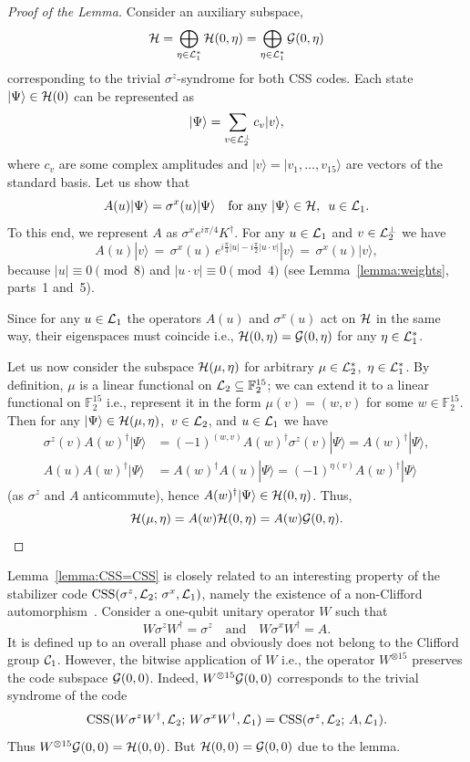 \documentclass[pra,twocolumn,showpacs]{revtex4}
\newcommand{\FF}{\mathbb{F}}
\newcommand{\calL}{{\cal L }}
\newcommand{\calH}{{\cal H }}
\newcommand{\calG}{{\cal G }}
\newcommand{\ra}{\rangle}
\newcommand*{\Cl}[1]{{\cal C}_{#1}}
\newcommand{\sx}{\sigma^x}
\newcommand{\sz}{\sigma^z}
\DeclareMathOperator*{\CSS}{\mathop{\mathrm{CSS}}}
\begin{document}
\begin{proof}[Proof of the Lemma]
Consider an auxiliary subspace,
\[
\calH=\bigoplus_{\eta\in \calL_1^*} \calH(0,\eta)=
\bigoplus_{\eta\in\calL_1^*} \calG(0,\eta)
\]
corresponding to the trivial $\sz$-syndrome for both CSS codes. Each
state $|\Psi\ra\in \calH(0)$ can be represented as
\[
|\Psi\ra = \sum_{v\in \calL_2^\perp} c_v |v\ra,
\]
where $c_v$ are some complex amplitudes and $|v\ra=|v_1,\ldots,v_{15}\ra$ are
vectors of the standard basis. Let us show that
\[
A(u)|\Psi\ra = \sx(u)|\Psi\ra\quad \text{for any}\ 
|\Psi\ra\in \calH,\,\ u\in\calL_1.
\]
To this end, we represent $A$ as $\sx e^{i\pi/4} K^\dag$. For any $u\in
\calL_1$ and $v\in\calL_2^{\perp}$ we have
\[
A(u)|v\ra \,=\,
\sigma^{x}(u)\, e^{i\frac{\pi}{4}|u|-i\frac{\pi}{2} |u\cdot v|}|v\ra
\,=\, \sigma^{x}(u) |v\ra,
\]
because $|u|\equiv 0\pmod{8}$ and $|u\cdot v|\equiv 0\pmod{4}$ (see
Lemma~\ref{lemma:weights}, parts~1 and~5).

Since for any $u\in \calL_1$ the operators $A(u)$ and $\sx(u)$ act on $\calH$
in the same way, their eigenspaces must coincide i.e.,
$\calH(0,\eta)=\calG(0,\eta)$ for any $\eta\in\calL_1^*$.

Let us now consider the subspace $\calH(\mu,\eta)$ for arbitrary
$\mu\in\calL_2^*$,\, $\eta\in\calL_1^*$. By definition, $\mu$ is a linear
functional on $\calL_2\subseteq\FF_{2}^{15}$; we can extend it to a linear
functional on $\FF_{2}^{15}$ i.e., represent it in the form $\mu(v)=(w,v)$
for some $w\in\FF_{2}^{15}$. Then for any $|\Psi\rangle\in\calH(\mu,\eta)$,\,
$v\in\calL_2$, and $u\in\calL_1$ we have
\begin{align*}
\sigma^{z}(v)A(w)^{\dag}|\Psi\rangle &=
(-1)^{(w,v)}A(w)^{\dag}\sigma^{z}(v)|\Psi\rangle
=A(w)^{\dag}|\Psi\rangle,\\[3pt]
A(u)A(w)^{\dag}|\Psi\rangle &=
A(w)^{\dag}A(u)|\Psi\rangle=(-1)^{\eta(v)}A(w)^{\dag}|\Psi\rangle
\end{align*}
(as $\sigma^{z}$ and $A$ anticommute), hence
$A(w)^{\dag}|\Psi\rangle\in\calH(0,\eta)$. Thus,
\[
\calH(\mu,\eta)=A(w)\calH(0,\eta)=A(w)\calG(0,\eta).
\]
\end{proof}

Lemma~\ref{lemma:CSS=CSS} is closely related to an interesting property of the
stabilizer code $\CSS(\sz,\calL_2; \,\sx,\calL_1)$, namely the existence of a
non-Clifford automorphism~\cite{KLZ96}.  Consider a one-qubit unitary operator
$W$ such that
\[
W \sz W^\dag =\sz \quad \text{and} \quad
W \sx W^\dag = A.
\]
It is defined up to an overall phase and obviously does not belong to the
Clifford group $\Cl{1}$. However, the bitwise application of $W$ i.e., the
operator $W^{\otimes 15}$ preserves the code subspace $\calG(0,0)$. Indeed,
$W^{\otimes 15}\calG(0,0)$ corresponds to the trivial syndrome of the code
\[
\CSS(W\sz W^{\dag},\calL_2;\,W\sx W^{\dag},\calL_1) = 
\CSS(\sz,\calL_2;\,A,\calL_1).
\]
Thus $W^{\otimes 15}\calG(0,0)=\calH(0,0)$. But $\calH(0,0)=\calG(0,0)$ due to
the lemma.
\end{document}
